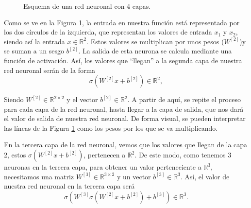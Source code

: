 \documentclass[a4paper,11pt,spanish, twoside, leqno]{tfg-uam}
\theoremstyle{definition}
\begin{document}
\begin{figure}
    \centering
    \caption{Esquema de una red neuronal con 4 capas.}
    \label{fig:RedNeuronal}
\end{figure}

Como se ve en la Figura \ref{fig:RedNeuronal}, la entrada en nuestra función está representada por los dos círculos de la izquierda, que representan los valores de entrada $x_1$ y $x_2$, siendo así la entrada $x\in\mathbb{R}^2$. Estos valores se multiplican por unos pesos ($W^{[2]}$)y se suman a un sesgo $b^{[2]}$. La salida de esta neurona se calcula mediante una función de activación. Así, los valores que ``llegan'' a la segunda capa de nuestra red neuronal serán de la forma
\begin{equation*}
    \sigma(W^{[2]}x+b^{[2]})\in\mathbb{R}^2,
\end{equation*}

Siendo $W^{[2]}\in\mathbb{R}^{2\times2}$ y el vector $b^{[2]}\in\mathbb{R}^2$. A partir de aquí, se repite el proceso para cada capa de la red neuronal, hasta llegar a la capa de salida, que nos dará el valor de salida de nuestra red neuronal. De forma visual, se pueden interpretar las líneas de la Figura \ref{fig:RedNeuronal} como los pesos por los que se va multiplicando.

En la tercera capa de la red neuronal, vemos que los valores que llegan de la capa 2, estos $\sigma(W^{[2]}x+b^{[2]})$, pertenecen a $\mathbb{R}^2$. De este modo, como tenemos 3 neuronas en la tercera capa, para obtener un valor perteneciente a $\mathbb{R}^3$, necesitamos una matriz $W^{[3]}\in\mathbb{R}^{3\times2}$ y un vector $b^{[3]}\in\mathbb{R}^3$. Así, el valor de nuestra red neuronal en la tercera capa será
\begin{equation*}
    \sigma(W^{[3]}\sigma(W^{[2]}x+b^{[2]})+b^{[3]})\in\mathbb{R}^3.
\end{equation*}
\end{document}
